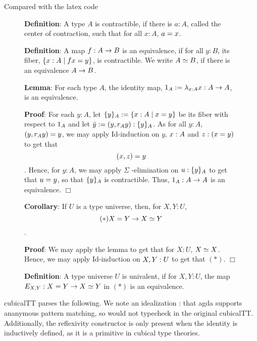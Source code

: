 Compared with the latex code

\begin{figure}[H]
 \textbf{Definition}:
 A type $A$ is contractible, if there is $a : A$, called the center of contraction, such that for all $x : A$, $a = x$.

 \textbf{Definition}:
 A map $f : A \rightarrow B$ is an equivalence, if for all $y : B$, its fiber, $\{ x : A \mid f x = y \}$, is contractible.
 We write $A \simeq B$, if there is an equivalence $A \rightarrow B$.

 \textbf{Lemma}:
 For each type $A$, the identity map, $1_{ A } := \lambda_{x : A} x : A \rightarrow A$, is an equivalence.

 \textbf{Proof}:
 For each $y : A$, let $\{ y \}_{ A } := \{ x : A \mid x = y \}$ be its fiber with respect to $1_{ A }$ and let $\bar{ y } := ( y , r_{ A } y ) : \{ y \}_{ A }$.
 As for all $y : A$, $( y , r_{ A } y ) = y$, we may apply Id-induction on $y$, $x : A$ and $z : ( x = y )$ to get that \[( x , z ) = y\].
 Hence, for $y : A$, we may apply $\Sigma$ -elimination on $u : \{ y \}_{ A }$ to get that $u = y$, so that $\{ y \}_{ A }$ is contractible.
 Thus, $1_{ A } : A \rightarrow A$ is an equivalence.
  $\Box$

 \textbf{Corollary}:
 If $U$ is a type universe, then, for $X , Y : U$, \[(*)X = Y \rightarrow X \simeq Y\].

 \textbf{Proof}:
 We may apply the lemma to get that for $X : U$, $X \simeq X$.
 Hence, we may apply Id-induction on $X , Y : U$ to get that $(*)$.
  $\Box$


 \textbf{Definition}:
 A type universe $U$ is univalent, if for $X , Y : U$, the map $E_ { X , Y }: X = Y \rightarrow X \simeq Y$ in $(*)$ is an equivalence.
\end{figure}

cubicalTT parses the following.  We note an idealization : that agda supports ananymous pattern matching, so 
  would not typecheck in the original cubicalTT. Additionally, the reflexivity constructor is only present when the identity is inductively defined, as it is a primitive in cubical type theories.

